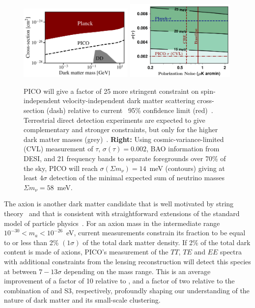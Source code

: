 \documentclass[PICOReport.tex]{subfiles}
\begin{document}
\begin{figure}[t]
\begin{center}
\includegraphics[width=0.50\textwidth]{images/pico_dd4.pdf}
\includegraphics[width=0.48\textwidth]{images/Mnu_tauprior_final.pdf}
\caption{ PICO will give a factor of 25 more stringent constraint on spin-independent velocity-independent dark matter scattering cross-section (dash) relative to current \planck\ 95\% confidence limit (red)~\citep{2018PhRvL.121h1301G}. Terrestrial direct detection experiments are expected to give complementary and stronger constraints, but only for the higher dark matter masses (grey)~\cite{2018PhRvD..97l3013K}. 
{\bf Right:} Using cosmic-variance-limited (CVL) measurement of $\tau,\, \sigma(\tau)=0.002$, \ac{BAO} information from DESI, and 21 frequency bands to separate foregrounds over 70\% of the sky, PICO will reach $\sigma(\Sigma m_{\nu}) = 14$~meV (contours) giving at least $4\sigma$ detection of the minimal expected sum of neutrino masses $\Sigma m_{\nu} = 58$~meV. 
\label{fig:DM_baryons} }
\end{center}
\vspace{-0.15in}
\end{figure}
%

The axion is another dark matter candidate that is well motivated by string theory~\citep{Arvanitaki_etal} and that is consistent with straightforward extensions of the standard model of particle physics~\citep{peccei,weinberg,wilczek}. For an axion mass in the intermediate range $10^{-30} < m_a< 10^{-26} $~eV, current measurements constrain its fraction to be equal to or less than 2\% $(1\sigma)$ of the total dark matter density. If 2\% of the total dark content is made of axions, PICO's measurement of the $TT$, $TE$ and $EE$ spectra with additional constraints from the lensing reconstruction will detect this species at between $7-13\sigma$ depending on the mass range. %
This is an average improvement of a factor of 10 relative to \planck, and a factor of two relative to the combination of \planck and S3, respectively, profoundly shaping our understanding of the nature of dark matter and its small-scale clustering. 
\end{document}
